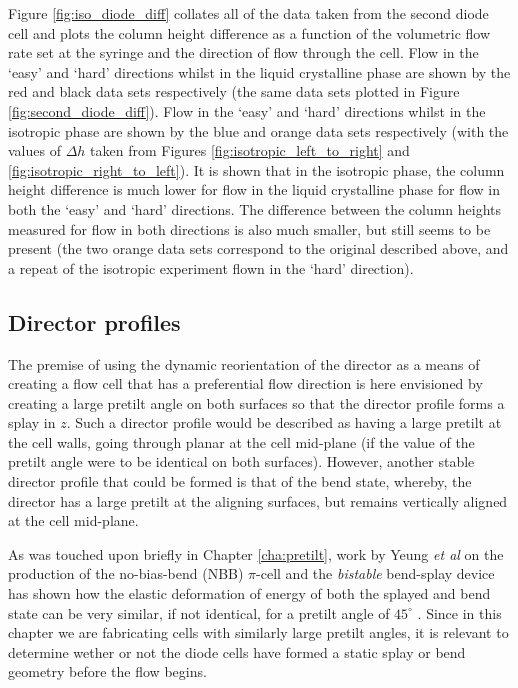 Figure \ref{fig:iso_diode_diff} collates all of the data taken from the second diode cell and plots the column height difference as a function of the volumetric flow rate set at the syringe and the direction of flow through the cell. Flow in the `easy' and `hard' directions whilst in the liquid crystalline phase  are shown by the red and black data sets respectively (the same data sets plotted in Figure \ref{fig:second_diode_diff}). Flow in the `easy' and `hard' directions whilst in the isotropic phase are shown by the blue and orange data sets respectively (with the values of $\Delta h$ taken from Figures \ref{fig:isotropic_left_to_right} and \ref{fig:isotropic_right_to_left}). It is shown that in the isotropic phase, the column height difference is much lower for flow in the liquid crystalline phase for flow in both the `easy' and `hard' directions. The difference between the column heights measured for flow in both directions is also much smaller, but still seems to be present (the two orange data sets correspond to the original described above, and a repeat of the isotropic experiment flown in the `hard' direction). 

\subsection{Director profiles}
The premise of using the dynamic reorientation of the director as a means of creating a flow cell that has a preferential flow direction is here envisioned by creating a large pretilt angle on both surfaces so that the director profile forms a splay in $z$. Such a director profile would be described as having a large pretilt at the cell walls, going through planar at the cell mid-plane (if the value of the pretilt angle were to be identical on both surfaces). However, another stable director profile that could be formed is that of the bend state, whereby, the director has a large pretilt at the aligning surfaces, but remains vertically aligned at the cell mid-plane.

As was touched upon briefly in Chapter \ref{cha:pretilt}, work by Yeung \textit{et al} \cite{Yeung2006,Yu2004,Yeung2005} on the production of the no-bias-bend (NBB) $\pi$-cell and the \textit{bistable} bend-splay device has shown how the elastic deformation of energy of both the splayed and bend state can be very similar, if not identical, for a pretilt angle of $45^{\circ}$ \cite{Yeung2005}. Since in this chapter we are fabricating cells with similarly large pretilt angles, it is relevant to determine wether or not the diode cells have formed a static splay or bend geometry before the flow begins.

